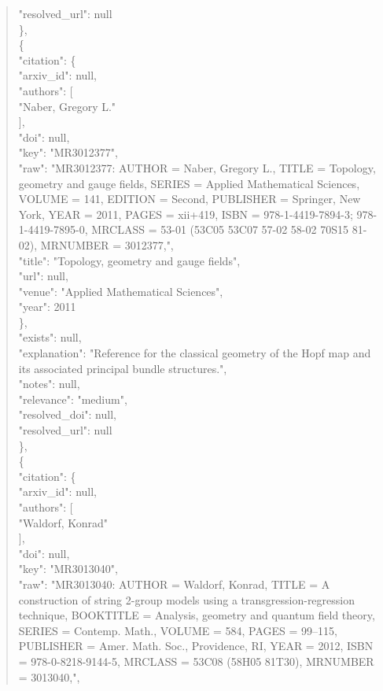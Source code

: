 \documentclass[11pt]{article}
\begin{document}
\begin{quote}
      "resolved\_url": null\\
    \},\\
    \{\\
      "citation": \{\\
        "arxiv\_id": null,\\
        "authors": [\\
          "Naber, Gregory L."\\
        ],\\
        "doi": null,\\
        "key": "MR3012377",\\
        "raw": "MR3012377: AUTHOR = Naber, Gregory L., TITLE = Topology, geometry and gauge fields, SERIES = Applied Mathematical Sciences, VOLUME = 141, EDITION = Second, PUBLISHER = Springer, New York, YEAR = 2011, PAGES = xii+419, ISBN = 978-1-4419-7894-3; 978-1-4419-7895-0, MRCLASS = 53-01 (53C05 53C07 57-02 58-02 70S15 81-02), MRNUMBER = 3012377,",\\
        "title": "Topology, geometry and gauge fields",\\
        "url": null,\\
        "venue": "Applied Mathematical Sciences",\\
        "year": 2011\\
      \},\\
      "exists": null,\\
      "explanation": "Reference for the classical geometry of the Hopf map and its associated principal bundle structures.",\\
      "notes": null,\\
      "relevance": "medium",\\
      "resolved\_doi": null,\\
      "resolved\_url": null\\
    \},\\
    \{\\
      "citation": \{\\
        "arxiv\_id": null,\\
        "authors": [\\
          "Waldorf, Konrad"\\
        ],\\
        "doi": null,\\
        "key": "MR3013040",\\
        "raw": "MR3013040: AUTHOR = Waldorf, Konrad, TITLE = A construction of string 2-group models using a transgression-regression technique, BOOKTITLE = Analysis, geometry and quantum field theory, SERIES = Contemp. Math., VOLUME = 584, PAGES = 99--115, PUBLISHER = Amer. Math. Soc., Providence, RI, YEAR = 2012, ISBN = 978-0-8218-9144-5, MRCLASS = 53C08 (58H05 81T30), MRNUMBER = 3013040,",\\

\end{quote}
\end{document}
